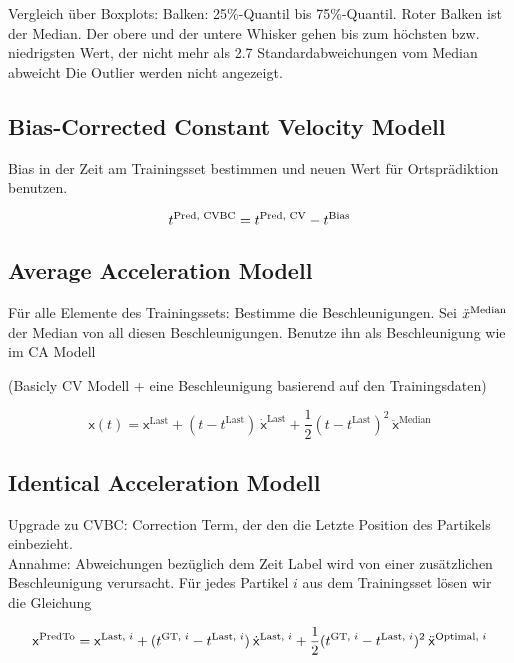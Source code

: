 Vergleich über Boxplots: Balken: 25\%-Quantil bis 75\%-Quantil.
Roter Balken ist der Median. Der obere und der untere Whisker 
gehen bis zum höchsten bzw. niedrigsten Wert, der nicht mehr als 2.7 Standardabweichungen vom Median abweicht
Die Outlier werden nicht angezeigt.


\subsection{Bias-Corrected Constant Velocity Modell}

Bias in der Zeit am Trainingsset bestimmen und neuen Wert für Ortsprädiktion benutzen.

\begin{equation*}
    t{^{\text{Pred, CVBC}}} = t{^{\text{Pred, CV}}} - t{^{\text{Bias}}}
\end{equation*}

\subsection{Average Acceleration Modell}

Für alle Elemente des Trainingssets: Bestimme die Beschleunigungen.
Sei \(\ddot{x}{^{\text{Median}}}\) der Median von all diesen Beschleunigungen.
Benutze ihn als Beschleunigung wie im CA Modell

(Basicly CV Modell + eine Beschleunigung basierend auf den Trainingsdaten)

\begin{equation*}
    \mathsf{x}(t) =  \mathsf{x}^{\text{Last}} + (t - t^{\text{Last}}) \: \dot{ \mathsf{x}}^{\text{Last}} 
    + \frac{1}{2} (t - t^{\text{Last}})^2 \: \ddot{ \mathsf{x}}^{\text{Median}}
\end{equation*}

\subsection{Identical Acceleration Modell}
 
Upgrade zu CVBC: Correction Term, der den die Letzte Position des Partikels einbezieht.\\
Annahme: Abweichungen bezüglich dem Zeit Label wird von einer zusätzlichen Beschleunigung verursacht.
Für jedes Partikel \( i\) aus dem Trainingsset lösen wir die Gleichung 

\begin{equation*}
    \mathsf{x}{^{\text{PredTo}}} =  \mathsf{x}{^{\text{Last, \(i\)}}} + (t{^{\text{GT, \(i\)}}} - t{^{\text{Last, \(i\)}}}) 
    \: \dot{ \mathsf{x}}{^{\text{Last, \(i\)}}}
    + \frac{1}{2}(t{^{\text{GT, \(i\)}}} - t{^{\text{Last, \(i\)}}})^2 \: \ddot{ \mathsf{x}}{^{\text{Optimal, \(i\)}}}
\end{equation*}

